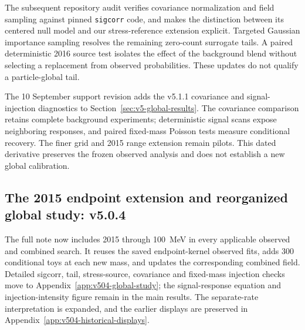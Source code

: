 The subsequent repository audit verifies covariance normalization and field
sampling against pinned \texttt{sigcorr} code, and makes the distinction
between its centered null model and our stress-reference extension explicit.
Targeted Gaussian importance sampling resolves the remaining zero-count
surrogate tails. A paired deterministic 2016 source test isolates the effect
of the background blend without selecting a replacement from observed
probabilities. These updates do not qualify a particle-global tail.


The 10 September support revision adds the v5.1.1 covariance and
signal-injection diagnostics to Section~\ref{sec:v5-global-results}.
The covariance comparison retains complete background experiments;
deterministic signal scans expose neighboring responses, and paired
fixed-mass Poisson tests measure conditional recovery. The finer grid and
2015 range extension remain pilots. This dated derivative preserves the
frozen observed analysis and does not establish a new global calibration.

\subsection{The 2015 endpoint extension and reorganized global study: v5.0.4}
The full note now includes 2015 through 100~MeV in every applicable observed
and combined search. It reuses the saved endpoint-kernel observed fits,
adds 300 conditional toys at each new mass, and updates the corresponding
combined field. Detailed sigcorr, tail, stress-source, covariance and
fixed-mass injection checks move to Appendix~\ref{app:v504-global-study};
the signal-response equation and injection-intensity figure remain in the
main results. The separate-rate interpretation is expanded, and the earlier
displays are preserved in Appendix~\ref{app:v504-historical-displays}.
